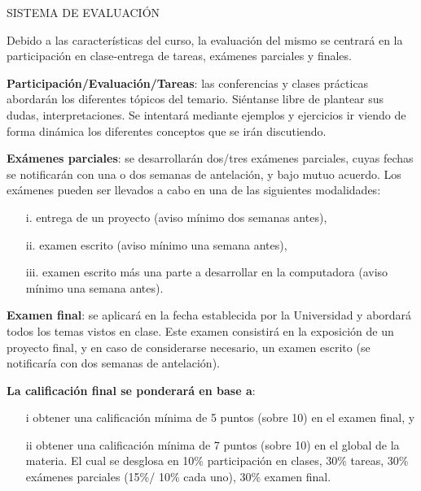 \documentclass[12pt]{amsart} %
\begin{document}
\parbox[c]{235pt}{SISTEMA DE EVALUACIÓN}
\vspace{10pt}

\hspace{0.375in} Debido a las características del curso, la evaluación del mismo se centrará en la participación en clase-entrega de tareas, exámenes parciales y finales.
\vspace{6pt}

\textbf{Participación/Evaluación/Tareas}: las conferencias y clases prácticas abordarán los diferentes tópicos del temario. Siéntanse libre de plantear sus dudas, interpretaciones. Se intentará mediante ejemplos y ejercicios ir viendo de forma dinámica los diferentes conceptos que se irán discutiendo.
\vspace{6pt}

\textbf{Exámenes parciales}: se desarrollarán dos/tres exámenes parciales, cuyas fechas se notificarán con una o dos semanas de antelación, y bajo mutuo acuerdo. Los exámenes pueden ser llevados a cabo en una de las siguientes modalidades:
\begin{itemize}
	\item[i.] entrega de un proyecto (aviso mínimo dos semanas antes),
	\item[ii.] examen escrito (aviso mínimo una semana antes),
	\item[iii.] examen escrito más una parte a desarrollar en la computadora (aviso mínimo una semana antes).
\end{itemize}
\vspace{6pt}

\textbf{Examen final}: se aplicará en la fecha establecida por la Universidad y abordará todos los temas vistos en clase. Este examen consistirá en la exposición de un proyecto final, y en caso de considerarse necesario, un examen escrito (se notificaría con dos semanas de antelación).

\vspace{14pt}

\textbf{La calificación final se ponderará en base a}:

\begin{enumerate}
	\item[i] obtener una calificación mínima de 5 puntos (sobre 10) en el examen final, y
	\item[ii] obtener una calificación mínima de 7 puntos (sobre 10) en el global de la materia. El cual se desglosa en 10\% participación en clases, 30\% tareas, 30\% exámenes parciales (15\%/ 10\% cada uno), 30\% examen final.
	\end{enumerate}
\end{document}
